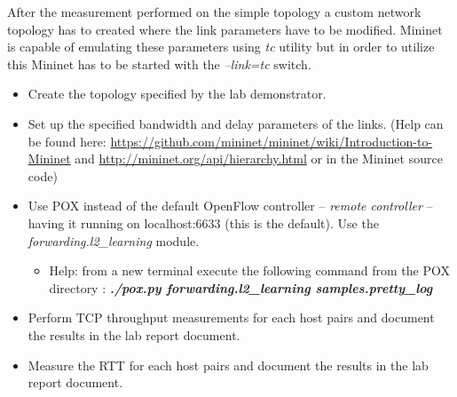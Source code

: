 \documentclass{article}
\begin{document}
After the measurement performed on the simple topology a custom network topology has to created where the link
parameters have to be modified. Mininet is capable of emulating these parameters using \emph{tc} utility but in order
to utilize this Mininet has to be started with the \emph{--link=tc} switch.
\begin{itemize}
    \item Create the topology specified by the lab demonstrator.
    \item Set up the specified bandwidth and delay parameters of the links. (Help can be found here:
          \url{https://github.com/mininet/mininet/wiki/Introduction-to-Mininet} and
          \url{http://mininet.org/api/hierarchy.html}
          or in the Mininet source code)
    \item Use POX instead of the default OpenFlow controller -- \emph{remote controller} -- having it running on
          localhost:6633 (this is the default). Use the \emph{forwarding.l2\_learning} module.
          \begin{itemize}
              \item Help: from a new terminal execute the following command from the POX directory :
                    \emph{\textbf{./pox.py
                            forwarding.l2\_learning samples.pretty\_log}}
          \end{itemize}
    \item Perform TCP throughput measurements for each host pairs and document the results in the lab report document.
    \item Measure the RTT for each host pairs and document the results in the lab report document.

\end{itemize}
%
%
\end{document}
